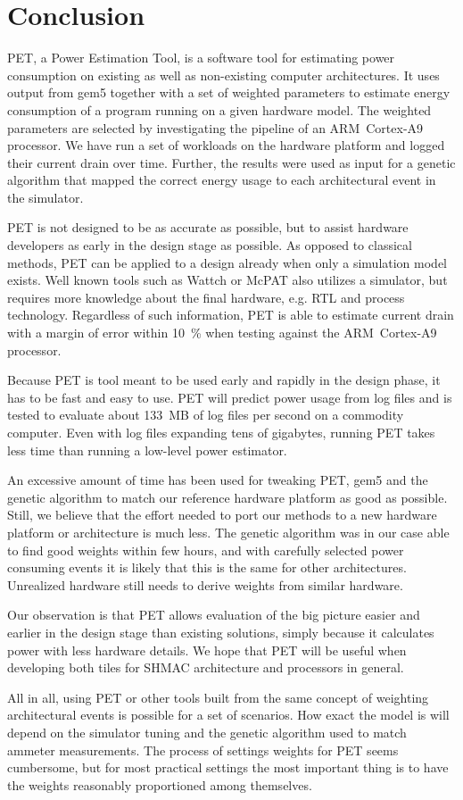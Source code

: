 \section{Conclusion}

PET, a Power Estimation Tool, is a software tool for estimating power
consumption on existing as well as non-existing computer architectures. It uses
output from gem5 together with a set of weighted parameters to estimate energy
consumption of a program running on a given hardware model. The weighted
parameters are selected by investigating the pipeline of an ARM~Cortex-A9
processor. We have run a set of workloads on the hardware platform and logged
their current drain over time. Further, the results were used as input for a
genetic algorithm that mapped the correct energy usage to each architectural
event in the simulator.

PET is not designed to be as accurate as possible, but to assist hardware
developers as early in the design stage as possible. As opposed to classical
methods, PET can be applied to a design already when only a simulation model
exists. Well known tools such as Wattch \cite{brooks2000wattch} or McPAT
\cite{li2009mcpat,li2013mcpat} also utilizes a simulator, but requires more knowledge about
the final hardware, e.g. RTL and process technology. Regardless of such
information, PET is able to estimate current drain with a margin of error within
10~\% when testing against the ARM~Cortex-A9 processor.

Because PET is tool meant to be used early and rapidly in the design phase, it
has to be fast and easy to use. PET will predict power usage from log files and
is tested to evaluate about 133~MB of log files per second on a commodity
computer. Even with log files expanding tens of gigabytes, running PET takes
less time than running a low-level power estimator.

An excessive amount of time has been used for tweaking PET, gem5 and the genetic
algorithm to match our reference hardware platform as good as possible. Still,
we believe that the effort needed to port our methods to a new hardware platform
or architecture is much less. The genetic algorithm was in our case able to find
good weights within few hours, and with carefully selected power consuming
events it is likely that this is the same for other architectures. Unrealized
hardware still needs to derive weights from similar hardware.

Our observation is that PET allows evaluation of the big picture easier and
earlier in the design stage than existing solutions, simply because it
calculates power with less hardware details. We hope that PET will be useful
when developing both tiles for SHMAC architecture and processors in general.

All in all, using PET or other tools built from the same concept of weighting
architectural events is possible for a set of scenarios. How exact the model is
will depend on the simulator tuning and the genetic algorithm used to match
ammeter measurements. The process of settings weights for PET seems cumbersome,
but for most practical settings the most important thing is to have the weights
reasonably proportioned among themselves.
